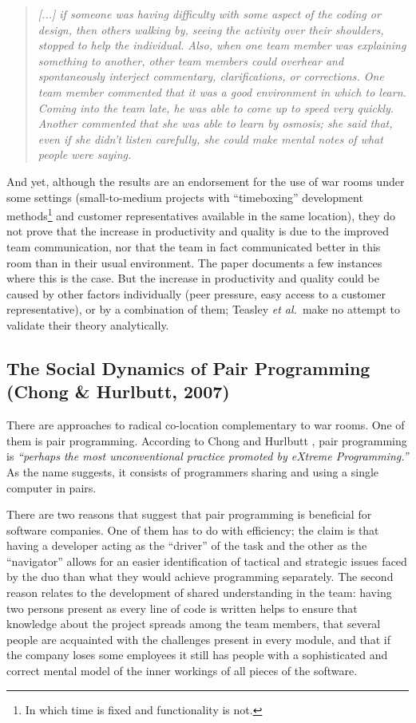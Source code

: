 \begin{quote}
\emph{[...] if someone was having difficulty with some aspect of the coding or design, then others walking by, seeing the activity over their shoulders, stopped to help the individual. Also, when one team member was explaining something to another, other team members could overhear and spontaneously interject commentary, clarifications, or corrections. One team member commented that it was a good environment in which to learn. Coming into the team late, he was able to come up to speed very quickly. Another commented that she was able to learn by osmosis; she said that, even if she didn't listen carefully, she could make mental notes of what people were saying.}
\end{quote}

And yet, although the results are an endorsement for the use of war rooms under some settings (small-to-medium projects with ``timeboxing'' development methods\footnote{In which time is fixed and functionality is not.} and customer representatives available in the same location), they do not prove that the increase in productivity and quality is due to the improved team communication, nor that the team in fact communicated better in this room than in their usual environment. The paper documents a few instances where this is the case. But the increase in productivity and quality could be caused by other factors individually (peer pressure, easy access to a customer representative), or by a combination of them; Teasley \emph{et al.}\ make no attempt to validate their theory analytically.


\subsection{The Social Dynamics of Pair Programming (Chong \& Hurlbutt, 2007)}

There are approaches to radical co-location complementary to war rooms. One of them is pair programming. According to Chong and Hurlbutt , pair programming is \emph{``perhaps the most unconventional practice promoted by eXtreme Programming.''} As the name suggests, it consists of programmers sharing and using a single computer in pairs.

There are two reasons that suggest that pair programming is beneficial for software companies. One of them has to do with efficiency; the claim is that having a developer acting as the ``driver'' of the task and the other as the ``navigator'' allows for an easier identification of tactical and strategic issues faced by the duo than what they would achieve programming separately. The second reason relates to the development of shared understanding in the team: having two persons present as every line of code is written helps to ensure that knowledge about the project spreads among the team members, that several people are acquainted with the challenges present in every module, and that if the company loses some employees it still has people with a sophisticated and correct mental model of the inner workings of all pieces of the software.

